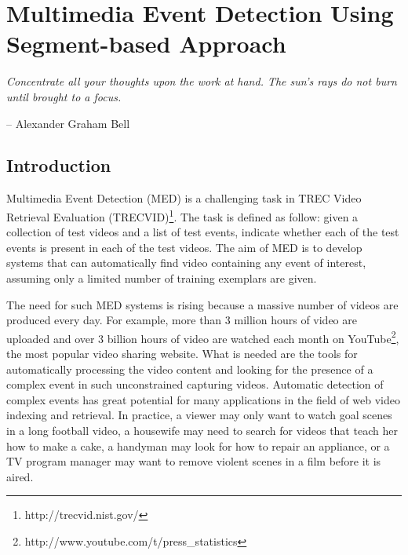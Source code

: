 
\chapter{Multimedia Event Detection Using Segment-based Approach}  %
\label{chapter3}
\epigraph{\textit{Concentrate all your thoughts upon the work at hand. The sun's rays do not burn until brought to a focus.}}{ -- Alexander Graham Bell}

\ifpdf
    \graphicspath{{Chapter3/Figs/Raster/}{Chapter3/Figs/PDF/}{Chapter3/Figs/}}
\else
    \graphicspath{{Chapter3/Figs/Vector/}{Chapter3/Figs/}}
\fi


\section{Introduction}
\label{introduction:1}
Multimedia Event Detection (MED) is a challenging task in TREC Video Retrieval Evaluation (TRECVID)\footnote{http://trecvid.nist.gov/}. The task is defined as follow: given a collection of test videos and a list of test events, indicate whether each of the test events is present in each of the test videos. The aim of MED is to develop systems that can automatically find video containing any event of interest, assuming only a limited number of training exemplars are given.



The need for such MED systems is rising because a massive number of videos are produced every day. For example, more than 3 million hours of video are uploaded and over 3 billion hours of video are watched each month on YouTube\footnote{http://www.youtube.com/t/press\_statistics}, the most popular video sharing website. What is needed are the tools for automatically processing the video content and looking for the presence of a complex event in such unconstrained capturing videos. Automatic detection of complex events has great potential for many applications in the field of web video indexing and retrieval. In practice, a viewer may only want to watch goal scenes in a long football video, a housewife may need to search for videos that teach her how to make a cake, a handyman may look for how to repair an appliance, or a TV program manager may want to remove violent scenes in a film before it is aired.

